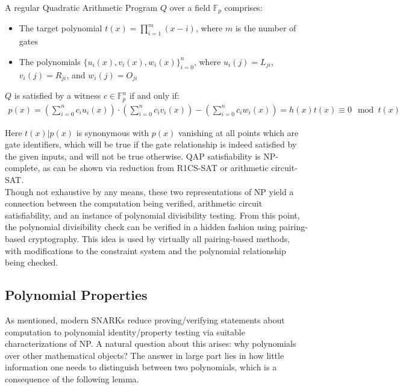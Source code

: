 \begin{definition}
A regular Quadratic Arithmetic Program $Q$ over a field $\mathbb{F}_p$ comprises:
\begin{itemize}
    \item The target polynomial $t(x) = \prod_{i=1}^m (x - i)$, where $m$ is the number of gates
    \item The polynomials $\{u_i(x), v_i(x), w_i(x)\}_{i=0}^n$, where $u_i(j) = L_{ji}$, $v_i(j) = R_{ji}$, and $w_i(j) = O_{ji}$
\end{itemize}

$Q$ is satisfied by a witness $c \in \mathbb{F}_p^n$ if and only if:
\begin{align}
p(x) = \left(\sum_{i=0}^n c_i u_i(x)\right) \cdot \left(\sum_{i=0}^n c_i v_i(x)\right) - \left(\sum_{i=0}^n c_i w_i(x)\right) = h(x)t(x) \equiv 0 \mod t(x)
\end{align}
\end{definition}

\noindent Here $t(x) | p(x)$ is synonymous with $p(x)$ vanishing at all points which are gate identifiers, which will be true if the gate relationship is indeed satisfied by the given inputs, and will not be true otherwise. QAP satisfiability is NP-complete, as can be shown via reduction from R1CS-SAT or arithmetic circuit-SAT.\\

\noindent Though not exhaustive by any means, these two representations of NP yield a connection between the computation being verified, arithmetic circuit satisfiability, and an instance of polynomial divisibility testing. From this point, the polynomial divisibility check can be verified in a hidden fashion using pairing-based cryptography. This idea is used by virtually all pairing-based methods, with modifications to the constraint system and the polynomial relationship being checked.

\subsection{Polynomial Properties}
\noindent As mentioned, modern SNARKs reduce proving/verifying statements about computation to polynomial identity/property testing via suitable characterizations of NP. A natural question about this arises: why polynomials over other mathematical objects? The answer in large part lies in how little information one needs to distinguish between two polynomials, which is a consequence of the following lemma.

